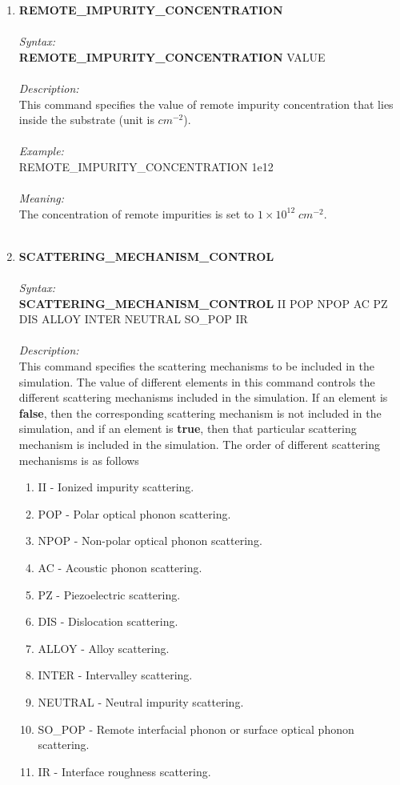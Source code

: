 \documentclass[12pt]{article}
\begin{document}
\begin{enumerate}
    \item \textbf{REMOTE\_IMPURITY\_CONCENTRATION} \\ \\
    \textit{Syntax:} \\
    \textbf{REMOTE\_IMPURITY\_CONCENTRATION} VALUE \\ \\
    \textit{Description:} \\
    This command specifies the value of remote impurity concentration that lies inside the substrate (unit is $cm^{-2}$).\\ \\
    \textit{Example:} \\
    REMOTE\_IMPURITY\_CONCENTRATION 1e12 \\ \\
    \textit{Meaning:} \\  
    The concentration of remote impurities is set to $1 \times 10^{12} \; cm^{-2}$. \\ \\
    
    \item \textbf{SCATTERING\_MECHANISM\_CONTROL}  \\ \\
    \textit{Syntax:} \\
    \textbf{SCATTERING\_MECHANISM\_CONTROL} II POP NPOP AC PZ DIS ALLOY INTER NEUTRAL SO\_POP IR \\ \\
    \textit{Description:} \\
    This command specifies the scattering mechanisms to be included in the simulation. The value of different elements in this command controls the different scattering mechanisms included in the simulation. If an element is \textbf{false}, then the corresponding scattering mechanism is not included in the simulation, and if an element is \textbf{true}, then that particular scattering mechanism is included in the simulation. The order of different scattering mechanisms is as follows 
    \begin{enumerate}
        \item II - Ionized impurity scattering.
        \item POP - Polar optical phonon scattering.
        \item NPOP - Non-polar optical phonon scattering.
        \item AC - Acoustic phonon scattering.
        \item PZ - Piezoelectric scattering.
        \item DIS - Dislocation scattering.
        \item ALLOY - Alloy scattering.
        \item INTER - Intervalley scattering.
        \item NEUTRAL - Neutral impurity scattering. 
        \item SO\_POP - Remote interfacial phonon or surface optical phonon scattering.
        \item IR - Interface roughness scattering.
    \end{enumerate}


\end{enumerate}
\end{document}
